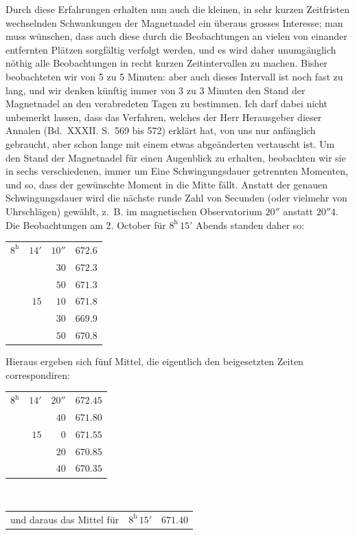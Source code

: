 Durch diese Erfahrungen erhalten nun auch die kleinen, in sehr kurzen Zeitfristen wechselnden Schwankungen der Magnetnadel ein überaus grosses Interesse; man muss wünschen, dass auch diese durch die Beobachtungen an vielen von einander entfernten Plätzen sorgfältig verfolgt werden, und es wird daher unumgänglich nöthig alle Beobachtungen in recht kurzen Zeitintervallen zu machen. Bisher beobachteten wir von 5 zu 5 Minuten: aber auch dieses Intervall ist noch fast zu lang, und wir denken künftig immer von 3 zu 3 Minuten den Stand der Magnetnadel an den verabredeten Tagen zu bestimmen. Ich darf dabei nicht unbemerkt lassen, dass das Verfahren, welches der Herr Herausgeber dieser Annalen (Bd.\ XXXII. S.\ 569 bis 572) erklärt hat, von uns nur anfänglich gebraucht, aber schon lange mit einem etwas abgeänderten vertauscht ist. Um den Stand der Magnetnadel für einen Augenblick zu erhalten, beobachten wir sie in sechs verschiedenen, immer um Eine Schwingungsdauer getrennten Momenten, und so, dass der gewünschte Moment in die Mitte fällt. Anstatt der genauen Schwingungsdauer wird die nächste runde Zahl von Secunden (oder vielmehr von Uhrschlägen) gewählt, z.\ B. im magnetischen Observatorium $20''$ anstatt $20''4$. Die Beobachtungen am 2. October für $8^{\mathrm h}\,15'$ Abends standen daher so:
\begin{center}
\begin{tabular}{rrr|r}
$8^{\mathrm h}$ & $14'$ & $10''$ & $672.6$\\
 & & $30$ & $672.3$\\
 & & $50$ & $671.3$\\
 & $15$ & $10$ & $671.8$\\
 & & $30$ & $669.9$\\
 & & $50$ & $670.8$
\end{tabular}
\end{center}
Hieraus ergeben sich fünf Mittel, die eigentlich den beigesetzten Zeiten correspondiren:
\begin{center}
\begin{tabular}{rrr|r}
$8^{\mathrm h}$ & $14'$ & $20''$ & $672.45$\\
 & & $40$ & $671.80$\\
 & $15$ & $0$ & $671.55$\\
 & & $20$ & $670.85$\\
 & & $40$ & $670.35$
\end{tabular}\\[2mm]
\begin{tabular}{lrr}
und daraus das Mittel für & $8^{\mathrm h}\,15'$ & $671.40$
\end{tabular}
\end{center}

